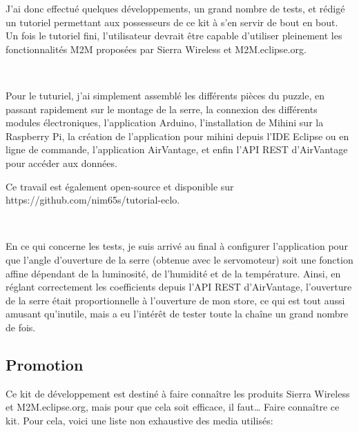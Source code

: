 \documentclass{article}
\begin{document}
J’ai donc effectué quelques développements, un grand nombre de tests, et rédigé un tutoriel permettant aux possesseurs de ce kit à s’en servir de bout en bout. Un fois le tutoriel fini, l’utilisateur devrait être capable d’utiliser pleinement les fonctionnalités M2M proposées par Sierra Wireless et M2M.eclipse.org.

~

Pour le tuturiel, j’ai simplement assemblé les différents pièces du puzzle, en passant rapidement sur le montage de la serre, la connexion des différents modules électroniques, l’application Arduino, l’installation de Mihini sur la Raspberry Pi, la création de l’application pour mihini depuis l’IDE Eclipse ou en ligne de commande, l’application AirVantage, et enfin l’API REST d’AirVantage pour accéder aux données.

Ce travail est également open-source et disponible sur https://github.com/nim65s/tutorial-eclo.

~

En ce qui concerne les tests, je suis arrivé au final à configurer l’application pour que l’angle d’ouverture de la serre (obtenue avec le servomoteur) soit une fonction affine dépendant de la luminosité, de l’humidité et de la température. 
Ainsi, en réglant correctement les coefficients depuis l’API REST d’AirVantage, l’ouverture de la serre était proportionnelle à l’ouverture de mon store, ce qui est tout aussi amusant qu’inutile, mais a eu l’intérêt de tester toute la chaîne un grand nombre de fois.

\subsection{Promotion}

Ce kit de développement est destiné à faire connaître les produits Sierra Wireless et M2M.eclipse.org, mais pour que cela soit efficace, il faut… Faire connaître ce kit. Pour cela, voici une liste non exhaustive des media utilisés:
\end{document}
